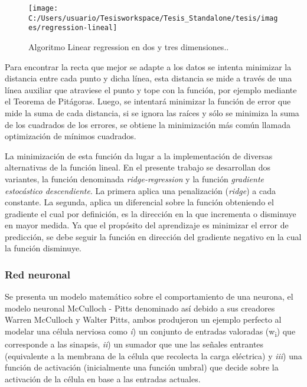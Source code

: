 \begin{figure}
\begin{centering}
\texttt{[image: C:/Users/usuario/Tesisworkspace/Tesis\_Standalone/tesis/images/regression-lineal]}
\par\end{centering}

\caption{Algoritmo Linear regression en dos y tres dimensiones.. \label{fig:regression-lineal}}
\end{figure}


Para encontrar la recta que mejor se adapte a los datos se intenta
minimizar la distancia entre cada punto y dicha línea, esta distancia
se mide a través de una línea auxiliar que atraviese el punto y tope
con la función, por ejemplo mediante el Teorema de Pitágoras. Luego,
se intentará minimizar la función de error que mide la suma de cada
distancia, si se ignora las raíces y sólo se minimiza la suma de los
cuadrados de los errores, se obtiene la minimización más común llamada
optimización de mínimos cuadrados. 

La minimización de esta función da lugar a la implementación de diversas
alternativas de la función lineal. En el presente trabajo se desarrollan
dos variantes, la función denominada \emph{ridge-regression }y la
función \emph{gradiente estocástico descendiente}. La primera aplica
una penalización (\emph{ridge}) a cada constante. La segunda, aplica
un diferencial sobre la función obteniendo el gradiente el cual por
definición, es la dirección en la que incrementa o disminuye en mayor
medida. Ya que el propósito del aprendizaje es minimizar el error
de predicción, se debe seguir la función en dirección del gradiente
negativo en la cual la función disminuye. 


\subsubsection{Red neuronal}

Se presenta un modelo matemático sobre el comportamiento de una neurona,
el modelo neuronal McCulloch - Pitts denominado así debido a sus creadores
Warren McCulloch y Walter Pitts, ambos produjeron un ejemplo perfecto
al modelar una célula nerviosa como \emph{i}) un conjunto de entradas
valoradas (w\textsubscript{i}) que corresponde a las sinapsis, \emph{ii})
un sumador que une las señales entrantes (equivalente a la membrana
de la célula que recolecta la carga eléctrica) y \emph{iii}) una función
de activación (inicialmente una función umbral) que decide sobre la
activación de la célula en base a las entradas actuales. 

